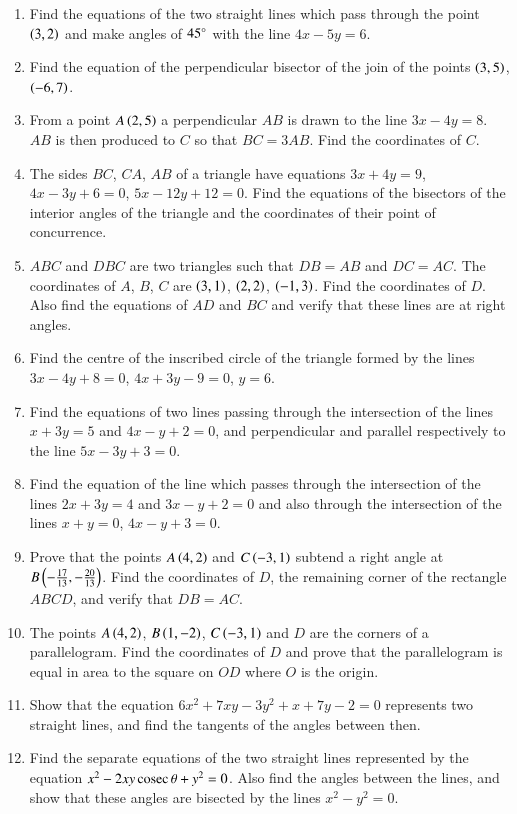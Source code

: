 \begin{enumerate}[label=\arabic*.,ref=\thesubsection.\theenumi]
\item Find the equations of the two straight lines which pass through the point $\left(3,2\right)$ and make angles of $45\degree$ with the line $4x-5y=6$.
\item Find the equation of the perpendicular bisector of the join of the points $\left(3,5\right)$, $\left(-6,7\right)$.
\item From a point $A \left(2,5\right)$ a perpendicular $AB$ is drawn to the line $3x-4y=8$.  $AB$ is then produced to $C$ so that $BC=3AB$.  Find
the coordinates of $C$.
\item The sides $BC$, $CA$, $AB$ of a triangle have equations $3x+4y=9$, $4x-3y+6=0$, $5x-12y+12=0$.  Find the equations of the
bisectors of the interior angles of the triangle and the coordinates of their point
of concurrence.
\item $ABC$ and $DBC$ are two triangles such that $DB=AB$ and $DC=AC$.  The coordinates of $A$, $B$, $C$
are $\left(3,1\right)$, $\left(2,2\right)$, $\left(-1,3\right)$.  Find the coordinates of $D$.  Also find the equations of $AD$ and $BC$ and verify that these lines are at right angles.
\item Find the centre of the inscribed circle of the triangle formed by the lines $3x-4y+8=0$, $4x+3y-9=0$, $y=6$.
\item Find the equations of two lines passing through the intersection of the lines $x+3y=5$ and $4x-y+2=0$,
and perpendicular and parallel respectively to the line $5x-3y+3=0$.
\item Find the equation of the line which passes through the intersection of the lines $2x+3y=4$ and $3x-y+2=0$
and also through the intersection of the lines $x+y=0$, $4x-y+3=0$.
\item Prove that the points $A \left(4,2\right)$ and $C \left(-3,1\right)$ subtend a right angle at $B \left(-\frac{17}{13}, -\frac{20}{13}\right)$.  Find the coordinates of $D$, the remaining
corner of the rectangle $ABCD$, and verify that $DB=AC$.
\item The points $A \left(4,2\right)$, $B \left(1,-2\right)$, $C \left(-3,1\right)$ and $D$ are the corners of a parallelogram.
Find the coordinates of $D$ and prove that the parallelogram is equal in area to the square on $OD$
where $O$ is the origin.
\item Show that the equation $6x^2+7xy-3y^2+x+7y-2=0$ represents two straight lines, and find the tangents of the angles between then.
\item Find the separate equations of the two straight lines represented by the
equation $x^2-2xy\,\text{cosec}\,\theta + y^2 = 0$.  Also find the angles between the lines, and show that these angles are bisected by the lines
$x^2-y^2 = 0$.
\end{enumerate}
